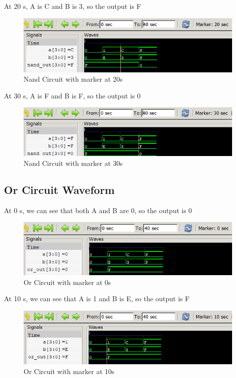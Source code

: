 \documentclass[12pt]{article}
\begin{document}
\newpage

At 20 s, A is C and B is 3, so the output is F
\begin{figure}[h]
    \centering
    \includegraphics[width = 1.0\textwidth]{figs/Nand20.png}
    \caption{Nand Circuit with marker at 20s}
    \label{fig:enter-label}
\end{figure}



At 30 s, A is F and B is F, so the output is 0
\begin{figure}[h]
    \centering
    \includegraphics[width = 1.0\textwidth]{figs/Nand30.png}
    \caption{Nand Circuit with marker at 30s}
    \label{fig:enter-label}
\end{figure}


\newpage



\subsection{Or Circuit Waveform}

At 0 s, we can see that both A and B are 0, so the output is 0
\begin{figure}[h]
    \centering
    \includegraphics[width = 1.0\textwidth]{figs/Or0.png}
    \caption{Or Circuit with marker at 0s}
    \label{fig:enter-label}
\end{figure}


At 10 s, we can see that A is 1 and B is E, so the output is F
\begin{figure}[h]
    \centering
    \includegraphics[width = 1.0\textwidth]{figs/Or10.png}
    \caption{Or Circuit with marker at 10s}
    \label{fig:enter-label}
\end{figure}
\end{document}
